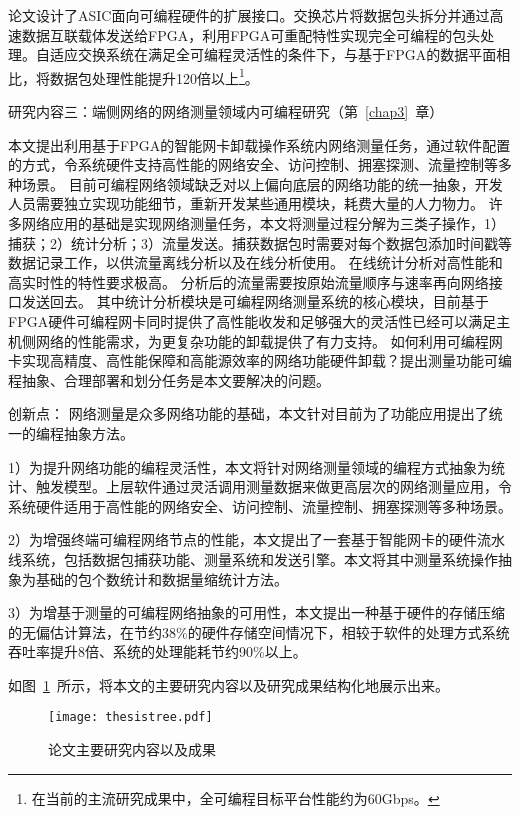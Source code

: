 论文设计了ASIC面向可编程硬件的扩展接口。交换芯片将数据包头拆分并通过高速数据互联载体发送给FPGA，利用FPGA可重配特性实现完全可编程的包头处理。自适应交换系统在满足全可编程灵活性的条件下，与基于FPGA的数据平面相比，将数据包处理性能提升120倍以上\footnote{在当前的主流研究成果中，全可编程目标平台性能约为60Gbps。}。

{\hei 研究内容三：端侧网络的网络测量领域内可编程研究（第~\ref{chap3}~章）}

{\hei 本文提出利用基于FPGA的智能网卡卸载操作系统内网络测量任务，通过软件配置的方式，令系统硬件支持高性能的网络安全、访问控制、拥塞探测、流量控制等多种场景。}
目前可编程网络领域缺乏对以上偏向底层的网络功能的统一抽象，开发人员需要独立实现功能细节，重新开发某些通用模块，耗费大量的人力物力。
许多网络应用的基础是实现网络测量任务，本文将测量过程分解为三类子操作，1）捕获；2）统计分析；3）流量发送。捕获数据包时需要对每个数据包添加时间戳等数据记录工作，以供流量离线分析以及在线分析使用。
在线统计分析对高性能和高实时性的特性要求极高。
分析后的流量需要按原始流量顺序与速率再向网络接口发送回去。
其中统计分析模块是可编程网络测量系统的核心模块，目前基于FPGA硬件可编程网卡同时提供了高性能收发和足够强大的灵活性已经可以满足主机侧网络的性能需求，为更复杂功能的卸载提供了有力支持。
如何利用可编程网卡实现高精度、高性能保障和高能源效率的网络功能硬件卸载？提出测量功能可编程抽象、合理部署和划分任务是本文要解决的问题。

{\hei 创新点：}
网络测量是众多网络功能的基础，本文针对目前为了功能应用提出了统一的编程抽象方法。

1）为提升网络功能的编程灵活性，本文将针对网络测量领域的编程方式抽象为统计、触发模型。上层软件通过灵活调用测量数据来做更高层次的网络测量应用，令系统硬件适用于高性能的网络安全、访问控制、流量控制、拥塞探测等多种场景。

2）为增强终端可编程网络节点的性能，本文提出了一套基于智能网卡的硬件流水线系统，包括数据包捕获功能、测量系统和发送引擎。本文将其中测量系统操作抽象为基础的包个数统计和数据量缩统计方法。

3）为增基于测量的可编程网络抽象的可用性，本文提出一种基于硬件的存储压缩的无偏估计算法，在节约38\%的硬件存储空间情况下，相较于软件的处理方式系统吞吐率提升8倍、系统的处理能耗节约90\%以上。



如图~\ref{fig:thesistree}~所示，将本文的主要研究内容以及研究成果结构化地展示出来。


\begin{figure}[!ht]
	\centering 
	\vspace{-1.5mm}
	\texttt{[image: thesistree.pdf]}
	\caption{论文主要研究内容以及成果} \label{fig:thesistree}
\end{figure}







